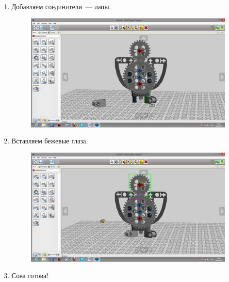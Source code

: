 \begin{enumerate}
\begin{figure}[h!]
\begin{center}
			\caption{}
			\label{ris:image3x18}
		\end{center}
	\end{figure}
	\clearpage
	\item Добавляем соединители~--- лапы.
	\begin{figure}[h!]
		\begin{center}
			\includegraphics[width=1\linewidth]{chapters/chapter3/images/19}
			\caption{}
			\label{ris:image3x19}
		\end{center}
	\end{figure}
	\item Вставляем бежевые глаза.
	\begin{figure}[h!]
		\begin{center}
			\includegraphics[width=1\linewidth]{chapters/chapter3/images/20}
			\caption{}
			\label{ris:image3x20}
		\end{center}
	\end{figure}
	\clearpage
	\item Сова готова!
	\begin{figure}[h!]
		\begin{center}

\end{center}
\end{figure}
\end{enumerate}
